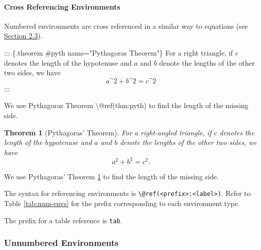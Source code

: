 \documentclass[
]{article}
\newenvironment{Shaded}{\begin{snugshade}}{\end{snugshade}}
\newcommand{\NormalTok}[1]{#1}
\numberwithin{equation}{section}
\numberwithin{figure}{section}
\theoremstyle{break}
\newtheorem{theorem}{Theorem}[section]
\theoremstyle{definition}
\theoremstyle{definition}
\theoremstyle{definition}
\theoremstyle{definition}
\theoremstyle{remark}
\begin{document}
\hypertarget{cross-referencing-environments}{%
\paragraph*{Cross Referencing Environments}\label{cross-referencing-environments}}

Numbered environments are cross referenced in a similar way to equations (see \protect\hyperlink{mathematics}{Section 2.3}).

\begin{Shaded}
\begin{Highlighting}[]
\NormalTok{::: \{.theorem \#pyth name="Pythagoras\textquotesingle{} Theorem"\}}
\NormalTok{For a right triangle, if $c$ denotes the length of the hypotenuse}
\NormalTok{and $a$ and $b$ denote the lengths of the other two sides, we have}
\NormalTok{$$a\^{}2 + b\^{}2 = c\^{}2$$}
\NormalTok{:::}
  
\NormalTok{We use Pythagoras\textquotesingle{} Theorem \textbackslash{}@ref(thm:pyth) to find the length of the missing side.}
\end{Highlighting}
\end{Shaded}

\begin{theorem}[Pythagoras' Theorem]
\protect\hypertarget{thm:pyth}{}\label{thm:pyth}
For a right-angled triangle, if \(c\) denotes the length of the hypotenuse
and \(a\) and \(b\) denote the lengths of the other two sides, we have
\[a^2 + b^2 = c^2.\]
\end{theorem}

We use Pythagoras' Theorem \ref{thm:pyth} to find the length of the missing side.

The syntax for referencing environments is \texttt{\textbackslash{}@ref(\textless{}prefix\textgreater{}:\textless{}label\textgreater{})}. Refer to Table \ref{tab:num-envs} for the prefix corresponding to each environment type.

The prefix for a table reference is \texttt{tab}.

\hypertarget{unnumbered-environments}{%
\subsubsection{Unnumbered Environments}\label{unnumbered-environments}}
\end{document}
